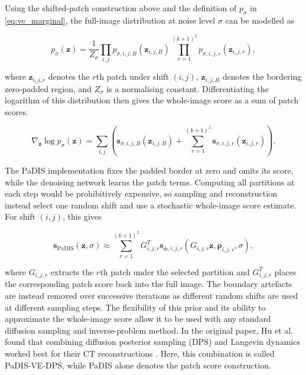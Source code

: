 Using the shifted-patch construction above and the definition of $p_\sigma$ in \autoref{eq:ve_marginal}, the full-image distribution at noise level $\sigma$ can be modelled as

\begin{equation}
p_\sigma(\mathbf{z})
=
\frac{1}{Z_\sigma}
\prod_{i,j}
p_{\sigma,i,j,B}(\mathbf{z}_{i,j,B})
\prod_{r=1}^{(k+1)^2}
p_{\sigma,i,j,r}(\mathbf{z}_{i,j,r}),
\label{eq:padis_full_image_distribution}
\end{equation}

where $\mathbf{z}_{i,j,r}$ denotes the $r$th patch under shift $(i,j)$, $\mathbf{z}_{i,j,B}$ denotes the bordering zero-padded region, and $Z_\sigma$ is a normalising constant. Differentiating the logarithm of this distribution then gives the whole-image score as a sum of patch scores.

\begin{equation}
\nabla_{\mathbf{z}}\log p_\sigma(\mathbf{z})
=
\sum_{i,j}
\left(
\mathbf{s}_{\sigma,i,j,B}(\mathbf{z}_{i,j,B})
+
\sum_{r=1}^{(k+1)^2}
\mathbf{s}_{\sigma,i,j,r}(\mathbf{z}_{i,j,r})
\right).
\label{eq:padis_whole_image_score_sum}
\end{equation}

The PaDIS implementation fixes the padded border at zero and omits its score, while the denoising network learns the patch terms. Computing all partitions at each step would be prohibitively expensive, so sampling and reconstruction instead select one random shift and use a stochastic whole-image score estimate. For shift $(i,j)$, this gives

\begin{equation}
\mathbf{s}_{\mathrm{PaDIS}}(\mathbf{z},\sigma)
\approx
\sum_{r=1}^{(k+1)^2}
G_{i,j,r}^T
\mathbf{s}_{\boldsymbol{\phi},i,j,r}
(G_{i,j,r}\mathbf{z},\boldsymbol{\rho}_{i,j,r},\sigma),
\label{eq:padis_score_estimate}
\end{equation}

where $G_{i,j,r}$ extracts the $r$th patch under the selected partition and $G_{i,j,r}^T$ places the corresponding patch score back into the full image. The boundary artefacts are instead removed over successive iterations as different random shifts are used at different sampling steps. The flexibility of this prior and its ability to approximate the whole-image score allow it to be used with any standard diffusion sampling and inverse-problem method. In the original paper, Hu et al. found that combining diffusion posterior sampling (DPS) and Langevin dynamics worked best for their CT reconstructions \cite{hu_learning_2024,chung_diffusion_2022,song_generative_2019}. Here, this combination is called PaDIS-VE-DPS, while PaDIS alone denotes the patch score construction.

